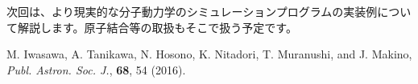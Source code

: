 \documentclass[twocolumn,10pt]{jarticle}
\begin{document}
次回は、より現実的な分子動力学のシミュレーションプログラムの実装例について解説します。原子結合等の取扱もそこで扱う予定です。


\begin{thebibliography}{9}
M. {Iwasawa},  A.  {Tanikawa}, N.  {Hosono}, K. {Nitadori},
T. {Muranushi}, and J. {Makino},
\textit{Publ. Astron. Soc. J.}, {\bf 68}, 54 (2016).
\end{thebibliography}


\profile
\end{document}
